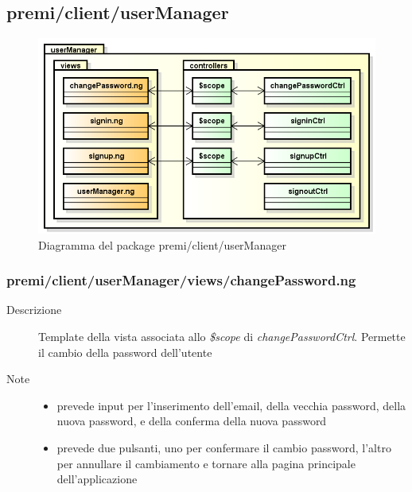 \clearpage
\subsection{premi/client/userManager}
\begin{figure}[H]
\begin{center}
\includegraphics[scale=0.50]{img/diapkg/userManager.png}
\caption{Diagramma del package premi/client/userManager}
\end{center}
\end{figure}



\subsubsection{premi/client/userManager/views/changePassword.ng}

\begin{description}
\item[Descrizione] \hfill
	Template della vista associata allo \textit{\$scope} di \textit{changePasswordCtrl}. Permette il cambio della password dell'utente
\item[Note] \hfill
	\begin{itemize}
			\item prevede input per l'inserimento dell'email, della vecchia password, della nuova password, e della conferma della nuova password
			\item prevede due pulsanti, uno per confermare il cambio password, l'altro per annullare il cambiamento e tornare alla pagina principale dell'applicazione
	\end{itemize}
\end{description}

